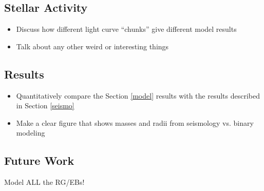 \subsection{Stellar Activity}
\begin{itemize}
\item Discuss how different light curve ``chunks'' give different model results
\item Talk about any other weird or interesting things
\end{itemize}

\subsection{Results}\label{results}
\begin{itemize}
\item Quantitatively compare the Section \ref{model} results with the \citet{gau14} results described in Section \ref{seismo}
\item Make a clear figure that shows masses and radii from seismology vs. binary modeling
\end{itemize}

\subsection{Future Work}\label{future}
Model ALL the RG/EBs!
